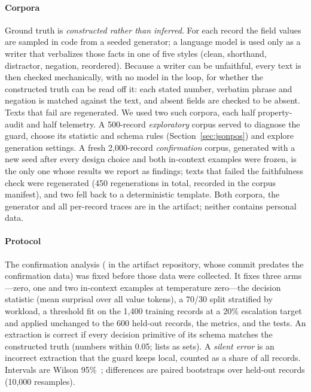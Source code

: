 \documentclass[conference]{IEEEtran}
\begin{document}
\paragraph{Corpora} Ground truth is \emph{constructed rather than inferred}. For each record the field values are sampled in code from a seeded generator; a language model is used only as a writer that verbalizes those facts in one of five styles (clean, shorthand, distractor, negation, reordered). Because a writer can be unfaithful, every text is then checked mechanically, with no model in the loop, for whether the constructed truth can be read off it: each stated number, verbatim phrase and negation is matched against the text, and absent fields are checked to be absent. Texts that fail are regenerated. We used two such corpora, each half property-audit and half telemetry. A 500-record \emph{exploratory} corpus served to diagnose the guard, choose its statistic and schema rules (Section~\ref{sec:jsonpos}) and explore generation settings. A fresh 2{,}000-record \emph{confirmation} corpus, generated with a new seed after every design choice and both in-context examples were frozen, is the only one whose results we report as findings; texts that failed the faithfulness check were regenerated (450 regenerations in total, recorded in the corpus manifest), and two fell back to a deterministic template. Both corpora, the generator and all per-record traces are in the artifact; neither contains personal data.

\paragraph{Protocol} The confirmation analysis ( in the artifact repository, whose commit predates the confirmation data) was fixed before those data were collected. It fixes three arms---zero, one and two in-context examples at temperature zero---the decision statistic (mean surprisal over all value tokens), a 70/30 split stratified by workload, a threshold fit on the 1{,}400 training records at a 20\% escalation target and applied unchanged to the 600 held-out records, the metrics, and the tests. An extraction is correct if every decision primitive of its schema matches the constructed truth (numbers within 0.05; lists as sets). A \emph{silent error} is an incorrect extraction that the guard keeps local, counted as a share of all records. Intervals are Wilson 95\%~\cite{wilson1927}; differences are paired bootstraps over held-out records (10{,}000 resamples).
\end{document}
